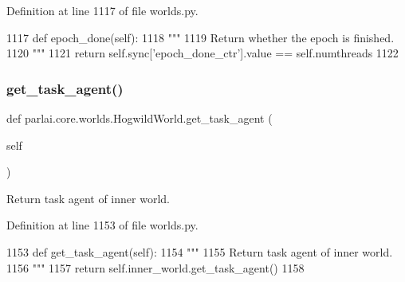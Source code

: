 Definition at line 1117 of file worlds.\+py.


\begin{DoxyCode}
1117     \textcolor{keyword}{def }epoch\_done(self):
1118         \textcolor{stringliteral}{"""}
1119 \textcolor{stringliteral}{        Return whether the epoch is finished.}
1120 \textcolor{stringliteral}{        """}
1121         \textcolor{keywordflow}{return} self.sync[\textcolor{stringliteral}{'epoch\_done\_ctr'}].value == self.numthreads
1122 
\end{DoxyCode}
\mbox{\label{classparlai_1_1core_1_1worlds_1_1HogwildWorld_a7dfc60f5229da37574c31479a0b2ce3a}} 
\subsubsection{\texorpdfstring{get\+\_\+task\+\_\+agent()}{get\_task\_agent()}}
{\footnotesize\ttfamily def parlai.\+core.\+worlds.\+Hogwild\+World.\+get\+\_\+task\+\_\+agent (\begin{DoxyParamCaption}\item[{}]{self }\end{DoxyParamCaption})}

\begin{DoxyVerb}Return task agent of inner world.
\end{DoxyVerb}
 

Definition at line 1153 of file worlds.\+py.


\begin{DoxyCode}
1153     \textcolor{keyword}{def }get\_task\_agent(self):
1154         \textcolor{stringliteral}{"""}
1155 \textcolor{stringliteral}{        Return task agent of inner world.}
1156 \textcolor{stringliteral}{        """}
1157         \textcolor{keywordflow}{return} self.inner\_world.get\_task\_agent()
1158 
\end{DoxyCode}
\mbox{\label{classparlai_1_1core_1_1worlds_1_1HogwildWorld_a6bc364b91906b14d792957c8eeed5206}} 
